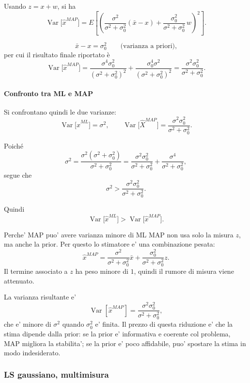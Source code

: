 \documentclass[11pt,a4paper]{article}
\begin{document}
Usando \(z=x+w\), si ha
\[
\operatorname{Var}\!\bigl[\hat x^{MAP}\bigr]
=
E\!\left[
\left(
\frac{\sigma^2}{\sigma^2+\sigma_0^2}(\bar x-x)
+
\frac{\sigma_0^2}{\sigma^2+\sigma_0^2}\,w
\right)^2
\right].
\]


\[
\bar x-x=\sigma_0^2
\qquad
\text{(varianza a priori),}
\]
per cui il risultato finale riportato è
\[
\operatorname{Var}\!\bigl[\hat x^{MAP}\bigr]
= \frac{\sigma^4\sigma_0^2}{(\sigma^2+\sigma_0^2)^2}+\frac{\sigma_0^4\sigma^2}{(\sigma^2+\sigma_0^2)^2} = 
\frac{\sigma^2\sigma_0^2}{\sigma^2+\sigma_0^2}.
\]

\paragraph{Confronto tra ML e MAP}

Si confrontano quindi le due varianze:
\[
\operatorname{Var}\!\bigl[\hat x^{ML}\bigr]=\sigma^2,
\qquad
\operatorname{Var}\!\bigl[\hat X^{MAP}\bigr]
=
\frac{\sigma^2\sigma_0^2}{\sigma^2+\sigma_0^2}.
\]

Poiché
\[
\sigma^2
=
\frac{\sigma^2(\sigma^2+\sigma_0^2)}{\sigma^2+\sigma_0^2}
=
\frac{\sigma^2\sigma_0^2}{\sigma^2+\sigma_0^2}
+
\frac{\sigma^4}{\sigma^2+\sigma_0^2},
\]
segue che
\[
\sigma^2
>
\frac{\sigma^2\sigma_0^2}{\sigma^2+\sigma_0^2}.
\]

Quindi
\[
\operatorname{Var}\!\bigl[\hat x^{ML}\bigr]
>
\operatorname{Var}\!\bigl[\hat x^{MAP}\bigr].
\]

\begin{spiegazione}{Perche' MAP puo' avere varianza minore di ML}
MAP non usa solo la misura $z$, ma anche la prior. Per questo lo stimatore e' una combinazione pesata:
\[
\hat x^{MAP}
=
\frac{\sigma^2}{\sigma^2+\sigma_0^2}\bar x
+
\frac{\sigma_0^2}{\sigma^2+\sigma_0^2}z.
\]
Il termine associato a $z$ ha peso minore di $1$, quindi il rumore di misura viene attenuato.

La varianza risultante e'
\[
\operatorname{Var}[\hat x^{MAP}]
=
\frac{\sigma^2\sigma_0^2}{\sigma^2+\sigma_0^2},
\]
che e' minore di $\sigma^2$ quando $\sigma_0^2$ e' finita. Il prezzo di questa riduzione e' che la stima dipende dalla prior: se la prior e' informativa e coerente col problema, MAP migliora la stabilita'; se la prior e' poco affidabile, puo' spostare la stima in modo indesiderato.
\end{spiegazione}



\subsubsection*{LS gaussiano, multimisura}
\end{document}
